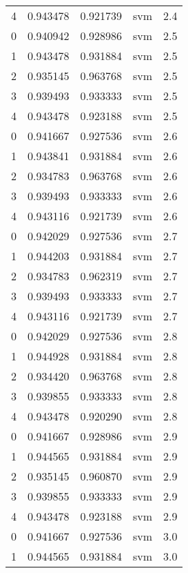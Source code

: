 \begin{tabular}{rrrlr}
     4 & 0.943478 & 0.921739 &      svm &        2.4 \\
     0 & 0.940942 & 0.928986 &      svm &        2.5 \\
     1 & 0.943478 & 0.931884 &      svm &        2.5 \\
     2 & 0.935145 & 0.963768 &      svm &        2.5 \\
     3 & 0.939493 & 0.933333 &      svm &        2.5 \\
     4 & 0.943478 & 0.923188 &      svm &        2.5 \\
     0 & 0.941667 & 0.927536 &      svm &        2.6 \\
     1 & 0.943841 & 0.931884 &      svm &        2.6 \\
     2 & 0.934783 & 0.963768 &      svm &        2.6 \\
     3 & 0.939493 & 0.933333 &      svm &        2.6 \\
     4 & 0.943116 & 0.921739 &      svm &        2.6 \\
     0 & 0.942029 & 0.927536 &      svm &        2.7 \\
     1 & 0.944203 & 0.931884 &      svm &        2.7 \\
     2 & 0.934783 & 0.962319 &      svm &        2.7 \\
     3 & 0.939493 & 0.933333 &      svm &        2.7 \\
     4 & 0.943116 & 0.921739 &      svm &        2.7 \\
     0 & 0.942029 & 0.927536 &      svm &        2.8 \\
     1 & 0.944928 & 0.931884 &      svm &        2.8 \\
     2 & 0.934420 & 0.963768 &      svm &        2.8 \\
     3 & 0.939855 & 0.933333 &      svm &        2.8 \\
     4 & 0.943478 & 0.920290 &      svm &        2.8 \\
     0 & 0.941667 & 0.928986 &      svm &        2.9 \\
     1 & 0.944565 & 0.931884 &      svm &        2.9 \\
     2 & 0.935145 & 0.960870 &      svm &        2.9 \\
     3 & 0.939855 & 0.933333 &      svm &        2.9 \\
     4 & 0.943478 & 0.923188 &      svm &        2.9 \\
     0 & 0.941667 & 0.927536 &      svm &        3.0 \\
     1 & 0.944565 & 0.931884 &      svm &        3.0 \\

\end{tabular}
